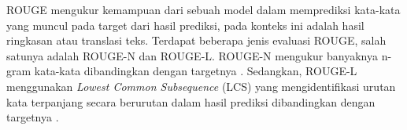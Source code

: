 ROUGE mengukur kemampuan dari sebuah model dalam memprediksi kata-kata yang muncul pada target dari hasil prediksi, pada konteks ini adalah hasil ringkasan atau translasi teks. Terdapat beberapa jenis evaluasi ROUGE, salah satunya adalah ROUGE-N dan ROUGE-L. ROUGE-N mengukur banyaknya n-gram kata-kata dibandingkan dengan targetnya \parencite{rouge}. Sedangkan, ROUGE-L menggunakan \textit{Lowest Common Subsequence} (LCS) yang mengidentifikasi urutan kata terpanjang secara berurutan dalam hasil prediksi dibandingkan dengan targetnya \parencite{rouge}.
